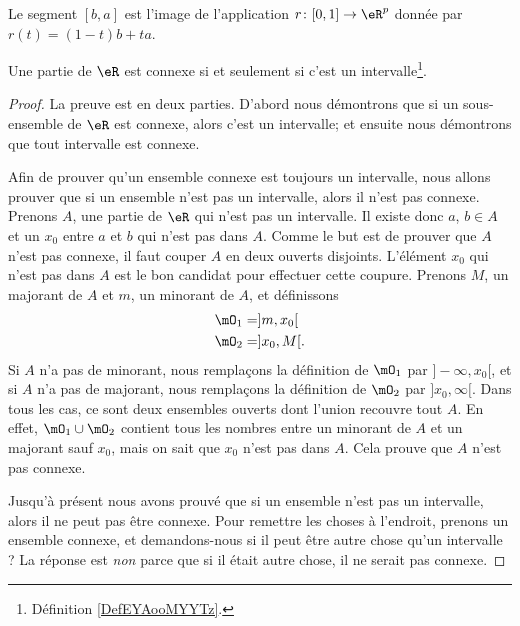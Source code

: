 Le segment \( [b,a]\) est l'image de l'application \( r\colon [0,1]\to \eR^p\) donnée par \( r(t)=(1-t)b+ta\).

\begin{proposition} \label{PropInterssiConn}
	Une partie de \( \eR\) est connexe si et seulement si c'est un intervalle\footnote{Définition \ref{DefEYAooMYYTz}.}.
\end{proposition}

\begin{proof}
	La preuve est en deux parties. D'abord nous démontrons que si un sous-ensemble de \( \eR\) est connexe, alors c'est un intervalle; et ensuite nous démontrons que tout intervalle est connexe.

	Afin de prouver qu'un ensemble connexe est toujours un intervalle, nous allons prouver que si un ensemble n'est pas un intervalle, alors il n'est pas connexe. Prenons \( A\), une partie de \( \eR\) qui n'est pas un intervalle. Il existe donc \( a\), \( b\in A\) et un \( x_0\) entre \( a\) et \( b\) qui n'est pas dans \( A\). Comme le but est de prouver que \( A\) n'est pas connexe, il faut couper \( A\) en deux ouverts disjoints. L'élément \( x_0\) qui n'est pas dans \( A\) est le bon candidat pour effectuer cette coupure. Prenons \( M\), un majorant de \( A\) et \( m\), un minorant de \( A\), et définissons
	\begin{align*}
		\mO_1 & =]m,x_0[  \\
		\mO_2 & =]x_0,M[.
	\end{align*}
	Si \( A\) n'a pas de minorant, nous remplaçons la définition de \( \mO_1\) par \( ]-\infty,x_0[\), et si \( A\) n'a pas de majorant, nous remplaçons la définition de \( \mO_2\) par \( ]x_0,\infty[\). Dans tous les cas, ce sont deux ensembles ouverts dont l'union recouvre tout \( A\). En effet, \( \mO_1\cup \mO_2\) contient tous les nombres entre un minorant de \( A\) et un majorant sauf \( x_0\), mais on sait que \( x_0\) n'est pas dans \( A\). Cela prouve que \( A\) n'est pas connexe.

	Jusqu'à présent nous avons prouvé que si un ensemble n'est pas un intervalle, alors il ne peut pas être connexe. Pour remettre les choses à l'endroit, prenons un ensemble connexe, et demandons-nous si il peut être autre chose qu'un intervalle ? La réponse est \emph{non} parce que si il était autre chose, il ne serait pas connexe.


\end{proof}

